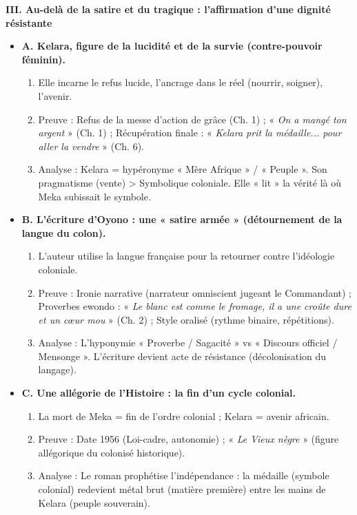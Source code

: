 \documentclass[11pt]{article}
\begin{document}
\begin{exoresolu}
\textbf{III. Au-delà de la satire et du tragique : l'affirmation d'une dignité résistante}
\begin{itemize}
    \item \textbf{A. Kelara, figure de la lucidité et de la survie (contre-pouvoir féminin).}
    \begin{enumerate}
        \item Elle incarne le refus lucide, l'ancrage dans le réel (nourrir, soigner), l'avenir.
        \item Preuve : Refus de la messe d'action de grâce (Ch. 1) ; « \emph{On a mangé ton argent} » (Ch. 1) ; Récupération finale : « \emph{Kelara prit la médaille... pour aller la vendre} » (Ch. 6).
        \item Analyse : Kelara = hypéronyme « Mère Afrique » / « Peuple ». Son pragmatisme (vente) > Symbolique coloniale. Elle « lit » la vérité là où Meka subissait le symbole.
    \end{enumerate}
    \item \textbf{B. L'écriture d'Oyono : une « satire armée » (détournement de la langue du colon).}
    \begin{enumerate}
        \item L'auteur utilise la langue française pour la retourner contre l'idéologie coloniale.
        \item Preuve : Ironie narrative (narrateur omniscient jugeant le Commandant) ; Proverbes ewondo : « \emph{Le blanc est comme le fromage, il a une croûte dure et un cœur mou} » (Ch. 2) ; Style oralisé (rythme binaire, répétitions).
        \item Analyse : L'hyponymie « Proverbe / Sagacité » vs « Discours officiel / Mensonge ». L'écriture devient acte de résistance (décolonisation du langage).
    \end{enumerate}
    \item \textbf{C. Une allégorie de l'Histoire : la fin d'un cycle colonial.}
    \begin{enumerate}
        \item La mort de Meka = fin de l'ordre colonial ; Kelara = avenir africain.
        \item Preuve : Date 1956 (Loi-cadre, autonomie) ; « \emph{Le Vieux nègre} » (figure allégorique du colonisé historique).
        \item Analyse : Le roman prophétise l'indépendance : la médaille (symbole colonial) redevient métal brut (matière première) entre les mains de Kelara (peuple souverain).
    \end{enumerate}
\end{itemize}


\end{exoresolu}
\end{document}
